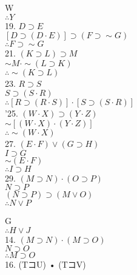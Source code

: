 W\\
$\therefore Y$\\
19. $D \supset E$\\
$[D \supset(D \cdot E)] \supset(F \supset \sim G)$\\
$\therefore F \supset \sim G$\\
21. $(K \supset L) \supset M$\\
$\sim M \cdot \sim(L \supset K)$\\
$\therefore \sim(K \supset L)$\\
23. $R \supset S$\\
$S \supset(S \cdot R)$\\
$\therefore[R \supset(R \cdot S)] \cdot[S \supset(S \cdot R)]$\\
'25. $(W \cdot X) \supset(Y \cdot Z)$\\
$\sim[(W \cdot X) \cdot(Y \cdot Z)]$\\
$\therefore \sim(W \cdot X)$\\
27. $(E \cdot F) \vee(G \supset H)$\\
$I \supset G$\\
$\sim(E \cdot F)$\\
$\therefore I \supset H$\\
29. $(M \supset N) \cdot(O \supset P)$\\
$N \supset P$\\
$(N \supset P) \supset(M \vee O)$\\
$\therefore N \vee P$

G\\
$\therefore H \vee J$\\
14. $(M \supset N) \cdot(M \supset O)$\\
$N \supset O$\\
$\therefore M \supset O$\\
16. (TコU) • (TコV)

